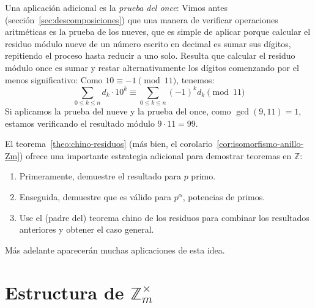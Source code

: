   Una aplicación adicional es la \emph{prueba del once}:
  Vimos antes
  (sección~\ref{sec:descomposiciones})
  que una manera de verificar operaciones aritméticas
  es la prueba de los nueves,
  que es simple de aplicar
  porque calcular el residuo módulo nueve
  de un número escrito en decimal
  es sumar sus dígitos,
  repitiendo el proceso hasta reducir a uno solo.
  Resulta que calcular el residuo módulo once
  es sumar y restar alternativamente los dígitos
  comenzando por el menos significativo:
  Como \(10 \equiv -1 \pmod{11}\),
  tenemos:
  \begin{equation*}
    \sum_{0 \le k \le n} d_k \cdot 10^k
      \equiv \sum_{0 \le k \le n} (-1)^k d_k \pmod{11}
  \end{equation*}
  Si aplicamos la prueba del nueve y la prueba del once,
  como \(\gcd(9, 11) = 1\),
  estamos verificando el resultado módulo \(9 \cdot 11 = 99\).

  El teorema~\ref{theo:chino-residuos}
  (más bien,
   el corolario~\ref{cor:isomorfismo-anillo-Zm})
  ofrece una importante estrategia adicional
  para demostrar teoremas en \(\mathbb{Z}\):
  \begin{enumerate}
  \item
    Primeramente,
    demuestre el resultado para \(p\) primo.
  \item
    Enseguida,
    demuestre que es válido para \(p^\alpha\),
    potencias de primos.
  \item
    Use el (padre del) teorema chino de los residuos
    para combinar los resultados anteriores
    y obtener el caso general.
  \end{enumerate}
  Más adelante aparecerán muchas aplicaciones de esta idea.

\section[Estructura de
	   \texorpdfstring{$\mathbb{Z}^\times_m$}
			  {las unidades de clases de congruencia}]
	{\protect\boldmath
	 Estructura de
	  \texorpdfstring{$\mathbb{Z}^\times_m$}
				{las unidades de clases de congruencia}%
       \protect\unboldmath}
\label{sec:estructura-Un}

